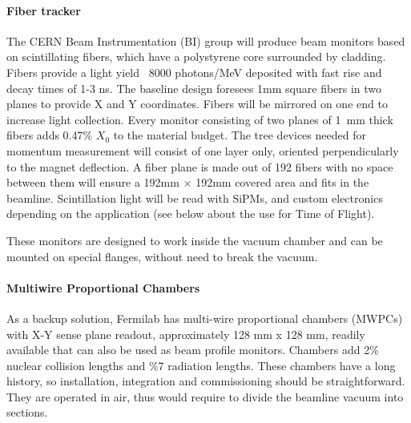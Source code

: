 \paragraph{Fiber tracker}
The CERN Beam Instrumentation (BI) group will produce
 beam monitors based on scintillating fibers, which have a polystyrene core surrounded by cladding\cite{Scifi}. Fibers provide a light yield ~8000 photons/MeV deposited with fast rise and decay times of 1-3 ns. The baseline design foresees 1mm square fibers in two planes to provide X and Y coordinates. Fibers will be mirrored on one end to increase
light collection.  Every monitor consisting of two planes of 1~mm thick fibers adds 0.47\% $X_0$ to the material budget. The tree devices needed for momentum measurement will consist of one layer only, oriented perpendicularly to the magnet deflection.
A fiber plane is made out of 192 fibers with no space between them will ensure a  192mm $\times$ 192mm covered area and fits in the beamline.
Scintillation light will be read  with SiPMs, and custom electronics depending on the application (see below about the use for Time of Flight).

These monitors are designed to work inside the vacuum chamber and can be mounted on special flanges, without need to break the vacuum.

\paragraph{Multiwire Proportional Chambers}
As a backup solution,
Fermilab has multi-wire proportional chambers (MWPCs) with X-Y sense plane
readout, approximately 128 mm x 128 mm, readily available that can also be used as beam profile monitors. 
Chambers add 2\% nuclear collision lengths and \%7 radiation lengths.
 These chambers have a long history, so installation, integration and commissioning should be straightforward. They are operated in air, thus would require to divide the beamline vacuum into sections.



